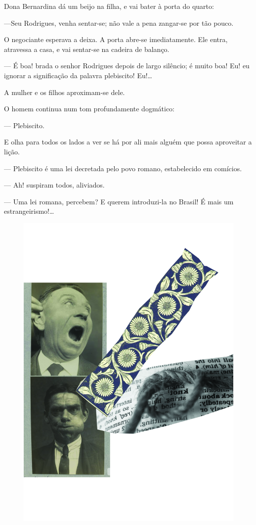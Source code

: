 Dona Bernardina dá um beijo na filha, e vai bater à porta do quarto:

---Seu Rodrigues, venha sentar-se; não vale a pena zangar-se por tão
pouco.

O negociante esperava a deixa. A porta abre-se imediatamente. Ele entra,
atravessa a casa, e vai sentar-se na cadeira de balanço.

--- É boa! brada o senhor Rodrigues depois de largo silêncio; é muito
boa! Eu! eu ignorar a significação da palavra plebiscito! Eu!\ldots{}

A mulher e os filhos aproximam-se dele.

O homem continua num tom profundamente dogmático:

--- Plebiscito.

E olha para todos os lados a ver se há por ali mais alguém que possa
aproveitar a lição.

--- Plebiscito é uma lei decretada pelo povo romano, estabelecido em
comícios.

--- Ah! suspiram todos, aliviados.

--- Uma lei romana, percebem? E querem introduzi-la no Brasil! É mais um
estrangeirismo!\ldots{}

\pagebreak
\thispagestyle{empty}
\begin{figure}
\vspace*{-.5cm}
\hspace*{-2.3cm}\includegraphics[width=140mm]{../ilustracoes/15_ASNEIRAS.jpg}
\end{figure}
\pagebreak


